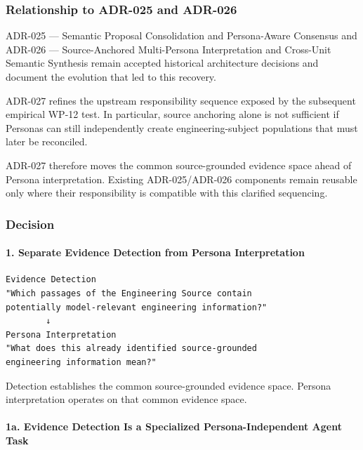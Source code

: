 \hypertarget{relationship-to-adr-025-and-adr-026}{%
\subsubsection{Relationship to ADR-025 and ADR-026}\label{relationship-to-adr-025-and-adr-026}}

ADR-025 --- Semantic Proposal Consolidation and Persona-Aware Consensus and ADR-026 --- Source-Anchored Multi-Persona Interpretation and Cross-Unit Semantic Synthesis remain accepted historical architecture decisions and document the evolution that led to this recovery.

ADR-027 refines the upstream responsibility sequence exposed by the subsequent empirical WP-12 test. In particular, source anchoring alone is not sufficient if Personas can still independently create engineering-subject populations that must later be reconciled.

ADR-027 therefore moves the common source-grounded evidence space ahead of Persona interpretation. Existing ADR-025/ADR-026 components remain reusable only where their responsibility is compatible with this clarified sequencing.

\hypertarget{decision-12}{%
\subsubsection{Decision}\label{decision-12}}

\hypertarget{1-separate-evidence-detection-from-persona-interpretation}{%
\paragraph{1. Separate Evidence Detection from Persona Interpretation}\label{1-separate-evidence-detection-from-persona-interpretation}}

\begin{verbatim}
Evidence Detection
"Which passages of the Engineering Source contain
potentially model-relevant engineering information?"
        ↓
Persona Interpretation
"What does this already identified source-grounded
engineering information mean?"
\end{verbatim}

Detection establishes the common source-grounded evidence space. Persona interpretation operates on that common evidence space.

\hypertarget{1a-evidence-detection-is-a-specialized-persona-independent-agent-task}{%
\paragraph{1a. Evidence Detection Is a Specialized Persona-Independent Agent Task}\label{1a-evidence-detection-is-a-specialized-persona-independent-agent-task}}

